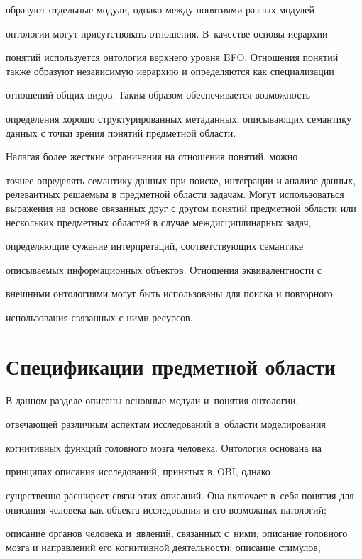 образуют отдельные модули, однако между понятиями разных модулей 

онтологии могут присутствовать отношения. В~качестве основы иерархии 

понятий используется онтология верхнего уровня BFO. Отношения понятий также образуют независимую иерархию и определяются как специализации 

отношений общих видов. Таким образом обеспечивается возможность 

определения хорошо структурированных метаданных, описывающих семантику данных с точки зрения понятий предметной области.

      

      Налагая более жесткие ограничения на отношения понятий, можно

 точнее определять семантику данных при поиске, интеграции и анализе данных, релевантных решаемым в предметной области задачам. Могут использоваться выражения на основе связанных друг с другом понятий предметной области или нескольких предметных областей в случае междисциплинарных задач,

 определяющие сужение интерпретаций, соответствующих семантике 

описываемых информационных объектов. Отношения эквивалентности с

 внешними онтологиями могут быть использованы для поиска и повторного 

использования связанных с ними ресурсов.



\section{Спецификации предметной области}



      В данном разделе описаны основные модули и~понятия онтологии,

 от\-ве\-ча\-ющей различным аспектам исследований в~области моделирования 

когнитивных функций головного мозга человека. Онтология основана на 

принципах описания исследований, принятых в~OBI, однако 

существенно расширяет связи этих описаний. Она включает в~себя понятия для описания человека как объекта исследования и его возможных патологий; 

описание органов человека и~явлений, связанных с~ними; описание головного мозга и направлений его когнитивной деятельности; описание стимулов, 

